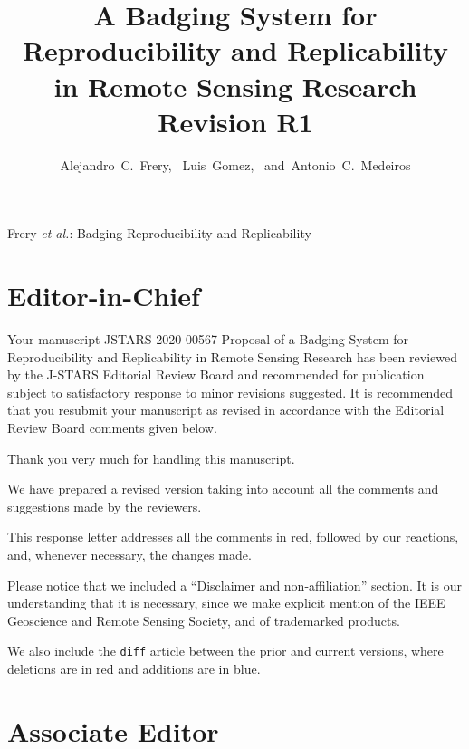 \documentclass[journal,onecolumn,draftcls,12pt]{IEEEtran}
\begin{document}
\title{A Badging System for Reproducibility and Replicability in Remote Sensing Research\\
	Revision R1}

\author{Alejandro~C.~Frery,~
	Luis~Gomez,~
	and~Antonio~C.~Medeiros}

%
{Frery \MakeLowercase{\textit{et al.}}: Badging Reproducibility and Replicability}

\maketitle

\IEEEpeerreviewmaketitle

\section{Editor-in-Chief}
\begin{tcolorbox}[colback=red!5!white,colframe=red!75!black,title=Comment \#1]
Your manuscript JSTARS-2020-00567 Proposal of a Badging System for Reproducibility and Replicability in Remote Sensing Research has been reviewed by the J-STARS Editorial Review Board and recommended for publication subject to satisfactory response to minor revisions suggested. It is recommended that you resubmit your manuscript as revised in accordance with the Editorial Review Board comments given below.
\end{tcolorbox}

Thank you very much for handling this manuscript.

We have prepared a revised version taking into account all the comments and suggestions made by the reviewers.

This response letter addresses all the comments in red, followed by
our reactions, and, whenever necessary, the changes made.

Please notice that we included a ``Disclaimer and non-affiliation'' section.
It is our understanding that it is necessary, since we make explicit mention of the IEEE Geoscience and Remote Sensing Society, and of trademarked products.

We also include the \texttt{diff} article between the prior and current versions, where deletions are in red and additions are in blue.

\section{Associate Editor}
\end{document}
